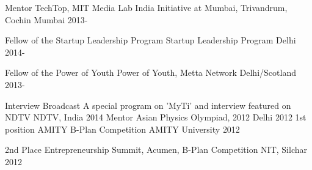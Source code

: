 



\begin{cvhonors}




    \cvhonor
    {Mentor} %
    {TechTop, MIT Media Lab India Initiative at Mumbai, Trivandrum, Cochin} %
    {Mumbai} %
    {2013-} %
    
  \cvhonor
    {Fellow of the Startup Leadership Program} %
    {Startup Leadership Program} %
    {Delhi} %
    {2014-} %

  \cvhonor
    {Fellow of the Power of Youth} %
    {Power of Youth, Metta Network} %
    {Delhi/Scotland} %
    {2013-} %




  \cvhonor
    {Interview Broadcast} %
    {A special program on 'MyTi' and interview featured on NDTV} %
    {NDTV, India} %
    {2014} %
    \cvhonor
{Mentor} %
{Asian Physics Olympiad, 2012} %
{Delhi} %
{2012} %
  \cvhonor
    {1st position} %
    {AMITY B-Plan Competition} %
    {AMITY University} %
    {2012} %

  \cvhonor
    {2nd Place} %
    {Entrepreneurship Summit, Acumen, B-Plan Competition} %
    {NIT, Silchar} %
    {2012} %



\end{cvhonors}
